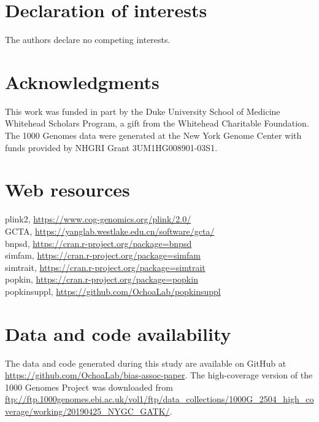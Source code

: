 \documentclass[11pt]{article}
\begin{document}
\section*{Declaration of interests}
The authors declare no competing interests.

\section*{Acknowledgments}
This work was funded in part by the Duke University School of Medicine Whitehead Scholars Program, a gift from the Whitehead Charitable Foundation.
The 1000 Genomes data were generated at the New York Genome Center with funds provided by NHGRI Grant 3UM1HG008901-03S1.

\section*{Web resources}
plink2, \url{https://www.cog-genomics.org/plink/2.0/}\\
GCTA, \url{https://yanglab.westlake.edu.cn/software/gcta/}\\
bnpsd, \url{https://cran.r-project.org/package=bnpsd}\\
simfam, \url{https://cran.r-project.org/package=simfam}\\
simtrait, \url{https://cran.r-project.org/package=simtrait}\\
popkin, \url{https://cran.r-project.org/package=popkin}\\
popkinsuppl, \url{https://github.com/OchoaLab/popkinsuppl}

\section*{Data and code availability}
The data and code generated during this study are available on GitHub at \url{https://github.com/OchoaLab/bias-assoc-paper}.
The high-coverage version of the 1000 Genomes Project was downloaded from \url{ftp://ftp.1000genomes.ebi.ac.uk/vol1/ftp/data_collections/1000G_2504_high_coverage/working/20190425_NYGC_GATK/}.


\printbibliography
\end{document}
